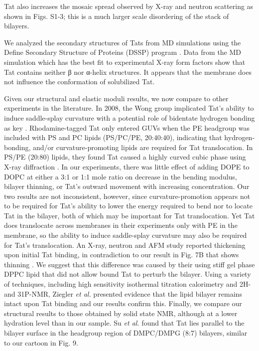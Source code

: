 Tat also increases the mosaic spread
observed by X-ray and neutron scattering as shown in Figs. S1-3; this is a much larger scale
disordering of the stack of bilayers.

We analyzed the secondary structures of Tats from MD simulations using the Define Secondary
Structure of Proteins (DSSP) program \cite{Kabsch83}. Data from the MD simulation which has the best fit
to experimental X-ray form factors show that Tat contains neither β nor α-helix structures.
It appears that the membrane does not influence the conformation of solubilized Tat. 

Given our structural and elastic moduli results, we now compare to other 
experiments in the literature. In 2008, the Wong group implicated Tat’s 
ability to induce saddle-splay curvature
with a potential role of bidentate hydrogen bonding as key \cite{Mishra08}. 
Rhodamine-tagged Tat only entered GUVs when the PE headgroup was included with 
PS and PC lipids (PS/PC/PE, 20:40:40), indicating that hydrogen-bonding, and/or 
curvature-promoting lipids are required for Tat translocation. 
In PS/PE (20:80) lipids, they found Tat caused a highly curved cubic phase
using X-ray diffraction \cite{Mishra08}. In our experiments, there was little 
effect of adding DOPE to DOPC at either a 3:1 or 1:1 mole ratio on decrease in 
the bending modulus, bilayer thinning, or Tat’s outward movement with increasing 
concentration. Our two results are not inconsistent, however, since 
curvature-promotion appears not to be required for Tat’s ability to lower the 
energy required to bend nor to locate Tat in the bilayer, both of which may be 
important for Tat translocation. Yet Tat does translocate across
membranes in their experiments only with PE in the membrane, so the ability to 
induce saddle-splay curvature may also be required for Tat’s translocation. 
An X-ray, neutron and AFM study reported thickening upon initial Tat binding, 
in contradiction to our result in Fig. 7B that shows thinning \cite{Choi12}. 
We suggest that this difference was caused by their using stiff gel phase DPPC 
lipid that did not allow bound Tat to perturb the bilayer. 
Using a variety of techniques, including high sensitivity isothermal titration 
calorimetry and 2H- and 31P-NMR, Ziegler \textit{et al.} \cite{Ziegler}
presented evidence that the lipid bilayer remains intact upon Tat binding
and our results confirm this. Finally, we compare our structural results to 
those obtained by solid state NMR, although at a lower hydration level than in 
our sample. Su \textit{et al.} \cite{Su10} found that Tat lies parallel to the 
bilayer surface in the headgroup region of DMPC/DMPG (8:7) bilayers,
similar to our cartoon in Fig. 9.

